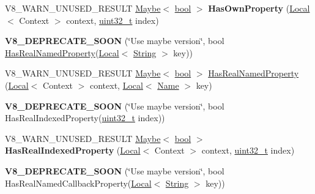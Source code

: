 \begin{DoxyCompactItemize}
\item 
\mbox{\label{classv8_1_1Object_afc24a716c4ee2a36e85ee5e453693f78}} 
V8\+\_\+\+W\+A\+R\+N\+\_\+\+U\+N\+U\+S\+E\+D\+\_\+\+R\+E\+S\+U\+LT \mbox{\hyperlink{classv8_1_1Maybe}{Maybe}}$<$ \mbox{\hyperlink{classbool}{bool}} $>$ {\bfseries Has\+Own\+Property} (\mbox{\hyperlink{classv8_1_1Local}{Local}}$<$ Context $>$ context, \mbox{\hyperlink{classuint32__t}{uint32\+\_\+t}} index)
\item 
\mbox{\label{classv8_1_1Object_abf24b52a108c801a74718e1a1e64ba5b}} 
{\bfseries V8\+\_\+\+D\+E\+P\+R\+E\+C\+A\+T\+E\+\_\+\+S\+O\+ON} (\char`\"{}Use maybe version\char`\"{}, bool \mbox{\hyperlink{classv8_1_1Object_a305a692fa4a571a41755520b6344fa1c}{Has\+Real\+Named\+Property}}(\mbox{\hyperlink{classv8_1_1Local}{Local}}$<$ \mbox{\hyperlink{classv8_1_1String}{String}} $>$ key))
\item 
V8\+\_\+\+W\+A\+R\+N\+\_\+\+U\+N\+U\+S\+E\+D\+\_\+\+R\+E\+S\+U\+LT \mbox{\hyperlink{classv8_1_1Maybe}{Maybe}}$<$ \mbox{\hyperlink{classbool}{bool}} $>$ \mbox{\hyperlink{classv8_1_1Object_a305a692fa4a571a41755520b6344fa1c}{Has\+Real\+Named\+Property}} (\mbox{\hyperlink{classv8_1_1Local}{Local}}$<$ Context $>$ context, \mbox{\hyperlink{classv8_1_1Local}{Local}}$<$ \mbox{\hyperlink{classv8_1_1Name}{Name}} $>$ key)
\item 
\mbox{\label{classv8_1_1Object_abd04e5cb82426a70ebea6afec8687c9e}} 
{\bfseries V8\+\_\+\+D\+E\+P\+R\+E\+C\+A\+T\+E\+\_\+\+S\+O\+ON} (\char`\"{}Use maybe version\char`\"{}, bool Has\+Real\+Indexed\+Property(\mbox{\hyperlink{classuint32__t}{uint32\+\_\+t}} index))
\item 
\mbox{\label{classv8_1_1Object_ab5406f985e576ac1d45b844197c3ef84}} 
V8\+\_\+\+W\+A\+R\+N\+\_\+\+U\+N\+U\+S\+E\+D\+\_\+\+R\+E\+S\+U\+LT \mbox{\hyperlink{classv8_1_1Maybe}{Maybe}}$<$ \mbox{\hyperlink{classbool}{bool}} $>$ {\bfseries Has\+Real\+Indexed\+Property} (\mbox{\hyperlink{classv8_1_1Local}{Local}}$<$ Context $>$ context, \mbox{\hyperlink{classuint32__t}{uint32\+\_\+t}} index)
\item 
\mbox{\label{classv8_1_1Object_ae1ffb11a0fa7549652d0530c0c4c4ca6}} 
{\bfseries V8\+\_\+\+D\+E\+P\+R\+E\+C\+A\+T\+E\+\_\+\+S\+O\+ON} (\char`\"{}Use maybe version\char`\"{}, bool Has\+Real\+Named\+Callback\+Property(\mbox{\hyperlink{classv8_1_1Local}{Local}}$<$ \mbox{\hyperlink{classv8_1_1String}{String}} $>$ key))

\end{DoxyCompactItemize}
